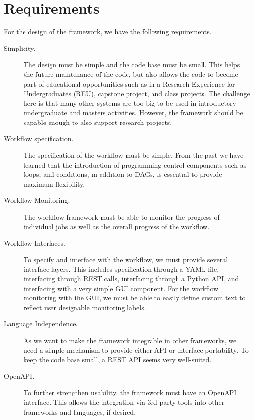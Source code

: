 
\section{Requirements}

For the design of the framework, we have the following requirements.

\begin{description}

\item[Simplicity.] The design must be simple and the code base must be small.
This helps the future maintenance of the code, but also allows the code
to become part of educational opportunities such as in a Research
Experience for Undergraduates (REU), capstone project, and class
projects. The challenge here is that many other systems are too big to
be used in introductory undergraduate and masters activities.
However, the framework should be capable enough to also support research projects.

\item[Workflow specification.] The specification of the workflow must be simple.
From the past we have learned that the introduction of programming control
components such as loops, and conditions, in addition to DAGs, is
essential to provide maximum flexibility.

\item[Workflow Monitoring.] The workflow framework must be able to monitor the
progress of individual jobs as well as the overall progress of the workflow.

\item[Workflow Interfaces.] To specify and interface with the workflow, we
must provide several interface layers. This includes specification
through a YAML file, interfacing through REST calls, interfacing
through a Python API, and interfacing with a very simple GUI component.
For the workflow monitoring with the GUI, we must be able to easily
define custom text to reflect user designable monitoring labels.

\item[Language Independence.] As we want to make the framework integrable in
other frameworks, we need a simple mechanism to provide either API or
interface portability. To keep the code base small, a REST API seems
very well-suited.

\item[OpenAPI.] To further strengthen usability, the framework must have an
OpenAPI interface. This allows the integration via 3rd party tools into
other frameworks and languages, if desired.


\end{description}
